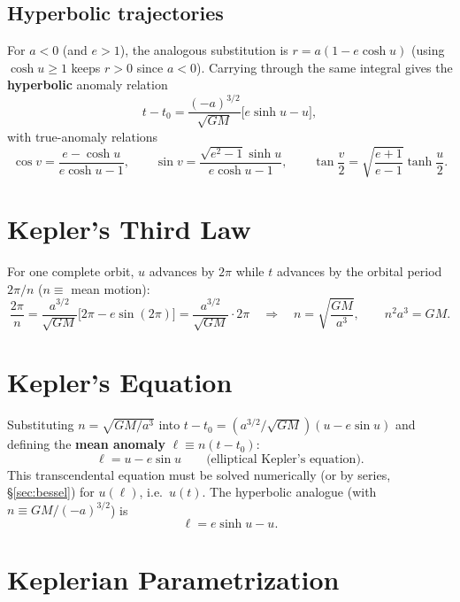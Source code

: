 \documentclass[11pt]{article}
\begin{document}
\subsection{Hyperbolic trajectories}
For $a<0$ (and $e>1$), the analogous substitution is $r=a(1-e\cosh u)$ (using $\cosh u\ge1$ keeps $r>0$ since $a<0$). Carrying through the same integral gives the \textbf{hyperbolic} anomaly relation
\[
t-t_0 = \frac{(-a)^{3/2}}{\sqrt{GM}}\big[e\sinh u - u\big],
\]
with true-anomaly relations
\begin{equation}
\cos v = \frac{e-\cosh u}{e\cosh u - 1},\qquad
\sin v = \frac{\sqrt{e^2-1}\sinh u}{e\cosh u-1},\qquad
\tan\frac v2=\sqrt{\frac{e+1}{e-1}}\tanh\frac u2. \label{eq:v_of_u_hyp}
\end{equation}

\section{Kepler's Third Law}

For one complete orbit, $u$ advances by $2\pi$ while $t$ advances by the orbital period $2\pi/n$ ($n\equiv$ mean motion):
\begin{equation}
\frac{2\pi}{n} = \frac{a^{3/2}}{\sqrt{GM}}\big[2\pi - e\sin(2\pi)\big] = \frac{a^{3/2}}{\sqrt{GM}}\cdot2\pi
\quad\Longrightarrow\quad
\boxed{n=\sqrt{\frac{GM}{a^3}},\qquad n^2a^3=GM.} \label{eq:kepler3}
\end{equation}

\section{Kepler's Equation}

Substituting $n=\sqrt{GM/a^3}$ into $t-t_0=(a^{3/2}/\sqrt{GM})(u-e\sin u)$ and defining the \textbf{mean anomaly} $\ell\equiv n(t-t_0)$:
\begin{equation}
\boxed{\ell = u - e\sin u} \qquad\text{(elliptical Kepler's equation).} \label{eq:kepler_eq}
\end{equation}
This transcendental equation must be solved numerically (or by series, \S\ref{sec:bessel}) for $u(\ell)$, i.e.\ $u(t)$. The hyperbolic analogue (with $n\equiv GM/(-a)^{3/2}$) is
\begin{equation}
\ell = e\sinh u - u. \label{eq:kepler_eq_hyp}
\end{equation}

\section{Keplerian Parametrization}
\label{sec:parametrization}
\end{document}

